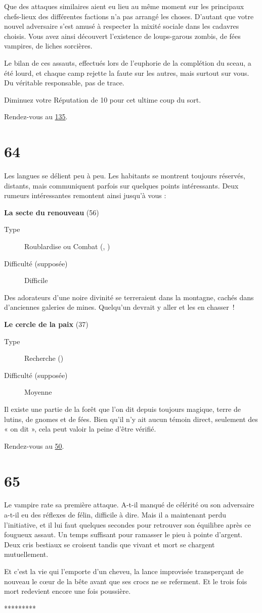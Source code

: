\documentclass{report}
\newcommand{\gsection}[1]{
    \section{#1}
    \label{section-#1}
}
\newcommand{\glink}[1]{\hyperref[section-#1]{#1}}
\newcommand{\quest}[5]{
    \begin{mdframed}[innertopmargin=0.5cm,innerbottommargin=0.5cm,leftmargin=0.5cm,rightmargin=0.5cm]
        \begin{center}
            \textbf{#1} (#2)
        \end{center}
        \begin{description}
            \item[Type] #3
            \item[Difficulté (supposée)] #4
        \end{description}
        #5
    \end{mdframed}
}
\newcommand{\ellipse}{
    \begin{center}
        *********
    \end{center}
}
\begin{document}
Que des attaques similaires aient eu lieu au même moment sur les principaux chefs-lieux des différentes factions n'a pas arrangé les choses. D'autant que votre nouvel adversaire s'est amusé à respecter la mixité sociale dans les cadavres choisis. Vous avez ainsi découvert l'existence de loups-garous zombis, de fées vampires, de liches sorcières.

Le bilan de ces assauts, effectués lors de l'euphorie de la complétion du sceau, a été lourd, et chaque camp rejette la faute sur les autres, mais surtout sur vous. Du véritable responsable, pas de trace.

Diminuez votre Réputation de 10 pour cet ultime coup du sort.

Rendez-vous au \glink{135}.

\gsection{64}

Les langues se délient peu à peu. Les habitants se montrent toujours réservés, distants, mais communiquent parfois sur quelques points intéressants. Deux rumeurs intéressantes remontent ainsi jusqu'à vous :

\clearpage

\quest{La secte du renouveau}{56}{Roublardise ou Combat (\ankh, \cross)}{Difficile}{
Des adorateurs d'une noire divinité se terreraient dans la montagne, cachés dans d'anciennes galeries de mines. Quelqu'un devrait y aller et les en chasser !
}

\quest{Le cercle de la paix}{37}{Recherche (\caduceus)}{Moyenne}{
Il existe une partie de la forêt que l'on dit depuis toujours magique, terre de lutins, de gnomes et de fées. Bien qu'il n'y ait aucun témoin direct, seulement des « on dit », cela peut valoir la peine d'être vérifié.
}

Rendez-vous au \glink{50}.

\gsection{65}

Le vampire rate sa première attaque. A-t-il manqué de célérité ou son adversaire a-t-il eu des réflexes de félin, difficile à dire. Mais il a maintenant perdu l'initiative, et il lui faut quelques secondes pour retrouver son équilibre après ce fougueux assaut. Un temps suffisant pour ramasser le pieu à pointe d'argent. Deux cris bestiaux se croisent tandis que vivant et mort se chargent mutuellement.

Et c'est la vie qui l'emporte d'un cheveu, la lance improvisée transperçant de nouveau le cœur de la bête avant que ses crocs ne se referment. Et le trois fois mort redevient encore une fois poussière.

\ellipse
\end{document}
